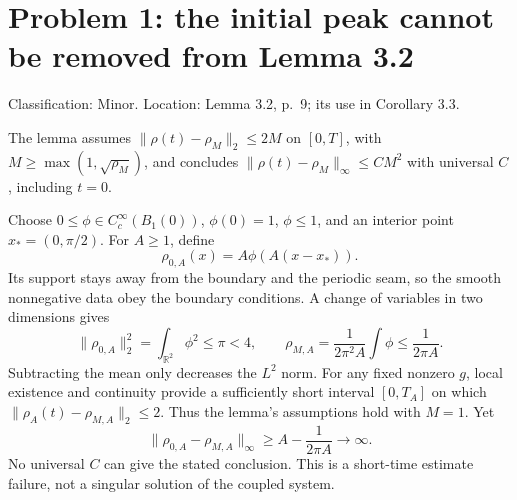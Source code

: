 \documentclass[10pt]{article}
\begin{document}
\section*{Problem 1: the initial peak cannot be removed from Lemma 3.2}
Classification: Minor. Location: Lemma 3.2, p. 9; its use in Corollary 3.3.\par
The lemma assumes \(\|\rho(t)-\rho_M\|_2\le2M\) on \([0,T]\), with \(M\ge\max(1,\sqrt{\rho_M})\), and concludes \(\|\rho(t)-\rho_M\|_\infty\le CM^2\) with universal \(C\), including \(t=0\).\par
Choose \(0\le\phi\in C_c^\infty(B_1(0))\), \(\phi(0)=1\), \(\phi\le1\), and an interior point \(x_*=(0,\pi/2)\). For \(A\ge1\), define \[\rho_{0,A}(x)=A\phi(A(x-x_*)).\] Its support stays away from the boundary and the periodic seam, so the smooth nonnegative data obey the boundary conditions. A change of variables in two dimensions gives \[\|\rho_{0,A}\|_2^2=\int_{\mathbb R^2}\phi^2\le\pi<4,\qquad
 \rho_{M,A}=\frac{1}{2\pi^2A}\int\phi\le\frac1{2\pi A}.\] Subtracting the mean only decreases the \(L^2\) norm. For any fixed nonzero \(g\), local existence and continuity provide a sufficiently short interval \([0,T_A]\) on which \(\|\rho_A(t)-\rho_{M,A}\|_2\le2\). Thus the lemma’s assumptions hold with \(M=1\). Yet \[\|\rho_{0,A}-\rho_{M,A}\|_\infty
 \ge A-\frac1{2\pi A}\longrightarrow\infty.\] No universal \(C\) can give the stated conclusion. This is a short-time estimate failure, not a singular solution of the coupled system.\par
\end{document}
